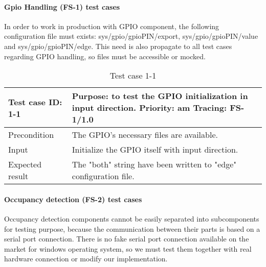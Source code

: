 \paragraph{Gpio Handling (FS-1) test cases} In order to work in production with GPIO component, the following configuration file must exists: sys/gpio/gpioPIN/export, sys/gpio/gpioPIN/value and sys/gpio/gpioPIN/edge. This need is also propagate to all test cases regarding GPIO handling, so files must be accessible or mocked. 
\begin{table}[H]
	\caption{Test case 1-1}
	\label{table:TCase-FS1-01}
	\begin{center}
		\renewcommand{\arraystretch}{1.8}
		\begin{tabu} 
			to 0.9 \textwidth
			{  X[0.3, l] X[l] }
			\toprule
			Test case ID: 1-1 & Purpose: to test the GPIO initialization in input direction. \newline Priority: am \newline Tracing: FS-1/1.0 \\ \midrule
			Precondition      & The GPIO's necessary files are available.                                                                     \\
			Input             & Initialize the GPIO itself with input direction.                                                              \\
			Expected result   & The "both" string have been written to "edge" configuration file.                                             \\ \bottomrule
		\end{tabu}
	\end{center}
\end{table}

\paragraph{Occupancy detection (FS-2) test cases} Occupancy detection components cannot be easily separated into subcomponents for testing purpose, because the communication between their parts is based on a serial port connection. There is no fake serial port connection available on the market for windows operating system, so we must test them together with real hardware connection or modify our implementation.

